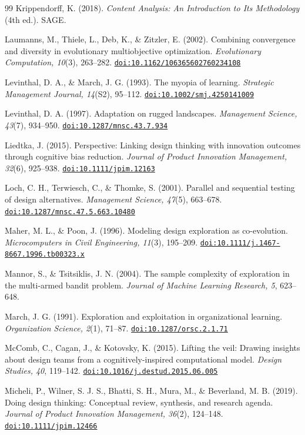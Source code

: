 \documentclass[10pt,twocolumn]{article}
\providecommand{\doi}[1]{\href{https://doi.org/#1}{\nolinkurl{doi:#1}}}
\theoremstyle{definition}
\begin{document}
\begin{thebibliography}{99}
 Krippendorff, K. (2018). \textit{Content Analysis: An Introduction to Its Methodology} (4th ed.). SAGE.

 Laumanns, M., Thiele, L., Deb, K., \& Zitzler, E. (2002). Combining convergence and diversity in evolutionary multiobjective optimization. \textit{Evolutionary Computation, 10}(3), 263--282. \doi{10.1162/106365602760234108}

 Levinthal, D. A., \& March, J. G. (1993). The myopia of learning. \textit{Strategic Management Journal, 14}(S2), 95--112. \doi{10.1002/smj.4250141009}

 Levinthal, D. A. (1997). Adaptation on rugged landscapes. \textit{Management Science, 43}(7), 934--950. \doi{10.1287/mnsc.43.7.934}

 Liedtka, J. (2015). Perspective: Linking design thinking with innovation outcomes through cognitive bias reduction. \textit{Journal of Product Innovation Management, 32}(6), 925--938. \doi{10.1111/jpim.12163}

 Loch, C. H., Terwiesch, C., \& Thomke, S. (2001). Parallel and sequential testing of design alternatives. \textit{Management Science, 47}(5), 663--678. \doi{10.1287/mnsc.47.5.663.10480}

 Maher, M. L., \& Poon, J. (1996). Modeling design exploration as co-evolution. \textit{Microcomputers in Civil Engineering, 11}(3), 195--209. \doi{10.1111/j.1467-8667.1996.tb00323.x}

 Mannor, S., \& Tsitsiklis, J. N. (2004). The sample complexity of exploration in the multi-armed bandit problem. \textit{Journal of Machine Learning Research, 5}, 623--648.

 March, J. G. (1991). Exploration and exploitation in organizational learning. \textit{Organization Science, 2}(1), 71--87. \doi{10.1287/orsc.2.1.71}

 McComb, C., Cagan, J., \& Kotovsky, K. (2015). Lifting the veil: Drawing insights about design teams from a cognitively-inspired computational model. \textit{Design Studies, 40}, 119--142. \doi{10.1016/j.destud.2015.06.005}

 Micheli, P., Wilner, S. J. S., Bhatti, S. H., Mura, M., \& Beverland, M. B. (2019). Doing design thinking: Conceptual review, synthesis, and research agenda. \textit{Journal of Product Innovation Management, 36}(2), 124--148. \doi{10.1111/jpim.12466}


\end{thebibliography}
\end{document}
